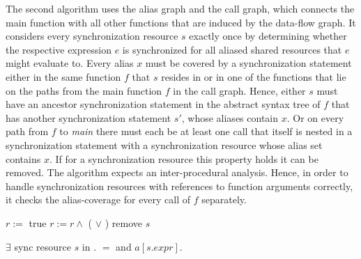 The second algorithm uses the alias graph and the call graph, which connects the main function with all other functions that are induced by the data-flow graph. It considers every synchronization resource $s$ exactly once by determining whether the respective expression $e$ is synchronized for all aliased shared resources that $e$ might evaluate to. Every alias $x$ must  be covered by a synchronization statement either in the same function $f$ that $s$ resides in or in one of the functions that lie on the paths from the main function $f$ in the call graph. Hence, either $s$ must have an ancestor synchronization statement in the abstract syntax tree of $f$ that has another synchronization statement $s'$, whose aliases contain $x$. Or on every path from $f$ to \textit{main} there must each be at least one call that itself is nested in a synchronization statement with a synchronization resource whose alias set contains $x$. If for a synchronization resource this property holds it can be removed. The algorithm expects an inter-procedural analysis. Hence, in order to handle synchronization resources with references to function arguments correctly, it checks the alias-coverage for every call of $f$ separately.

\begin{algorithmic}
\State {}
    \State $r :=$ true 
      \State $r := r \land$ ( $\lor$  )
    \EndFor
      \State remove $s$
    \EndIf
  \EndFor
\EndFor
\EndFunction
\end{algorithmic}


\begin{algorithmic}
\State {}
\State \Return $\exists$ sync resource $s$ in  $.$  $=$  and $a[s.\mathit{expr}]$.
\EndFunction
\end{algorithmic}

